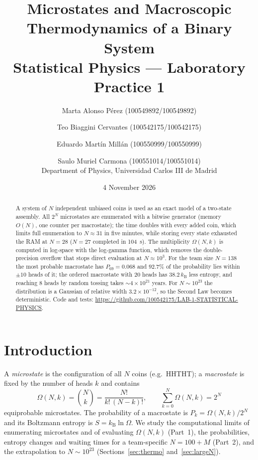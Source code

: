 \documentclass[11pt,a4paper]{article}
\title{Microstates and Macroscopic Thermodynamics of a Binary System\\[2pt]\large Statistical Physics --- Laboratory Practice 1}
\author{Marta Alonso Pérez (100549892/100549892) \and Teo Biaggini Cervantes (100542175/100542175) \and Eduardo Martín Millán (100550999/100550999) \and Saulo Muriel Carmona (100551014/100551014)\\[4pt]
Department of Physics, Universidad Carlos III de Madrid}
\date{4 November 2026}
\newcommand{\kB}{k_{\mathrm B}}
\newcommand{\Om}{\Omega}
\begin{document}
\maketitle

\begin{abstract}
A system of $N$ independent unbiased coins is used as an exact model of a two-state assembly. All
$2^N$ microstates are enumerated with a bitwise generator (memory $O(N)$, one counter per macrostate); the time doubles with every
added coin, which limits full enumeration to $N\approx31$ in five minutes, while storing every state
exhausted the RAM at $N=28$ ($N=27$ completed in 104~s). The multiplicity $\Om(N,k)$ is computed in log-space with the
log-gamma function, which removes the double-precision overflow that stops direct evaluation at $N\approx10^3$.
For the team size $N=138$ the most probable macrostate has $P_{69}=0.068$ and $92.7\%$ of the probability lies within
$\pm10$ heads of it; the ordered macrostate with 20 heads has $38.2\,\kB$ less entropy, and reaching 8 heads by random tossing
takes $\sim4\times10^{21}$ years. For $N\sim10^{23}$ the distribution is a Gaussian of relative width
$3.2\times10^{-12}$, so the Second Law becomes deterministic. Code and tests:
\url{https://github.com/100542175/LAB-1-STATISTICAL-PHYSICS}.
\end{abstract}

\section{Introduction}
A \emph{microstate} is the configuration of all $N$ coins (e.g.\ HHTHT); a \emph{macrostate} is fixed by the number
of heads $k$ and contains
\begin{equation}
  \Om(N,k)=\binom{N}{k}=\frac{N!}{k!\,(N-k)!},\qquad \sum_{k=0}^{N}\Om(N,k)=2^N
  \label{eq:omega}
\end{equation}
equiprobable microstates. The probability of a macrostate is $P_k=\Om(N,k)/2^N$ and its Boltzmann entropy is
$S=\kB\ln\Om$. We study the computational limits of enumerating microstates and of evaluating $\Om(N,k)$ (Part~1), the
probabilities, entropy changes and waiting times for a team-specific $N=100+M$ (Part~2), and the extrapolation to
$N\sim10^{23}$ (Sections~\ref{sec:thermo} and~\ref{sec:largeN}).
\end{document}
